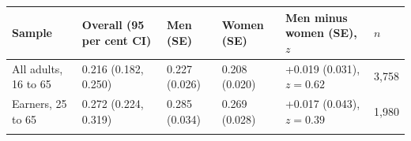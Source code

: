 \setlength{\tabcolsep}{2pt}
\begin{tabular}{@{}llllll@{}}
\toprule
Sample & Overall (95 per cent CI) & Men (SE) & Women (SE) & Men minus women (SE), $z$ & $n$\\
\midrule
All adults, 16 to 65 & 0.216 (0.182, 0.250) & 0.227 (0.026) & 0.208 (0.020) & +0.019 (0.031), $z = 0.62$ & 3,758\\
Earners, 25 to 65 & 0.272 (0.224, 0.319) & 0.285 (0.034) & 0.269 (0.028) & +0.017 (0.043), $z = 0.39$ & 1,980\\
\botrule
\end{tabular}
